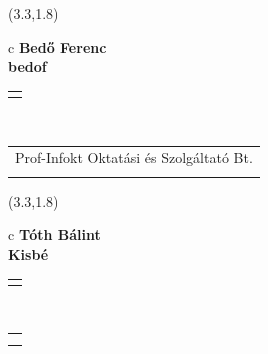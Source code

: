 \documentclass[11pt]{article}
\begin{document}
\makebox(3.3,1.8){
  \renewcommand\arraystretch{1.3}
  \begin{tabular}[c]{c}
    \hspace{8.5mm}
    \LARGE\bf{ Bedő Ferenc }\\
    \hspace{8.5mm}
    \Large{ bedof }\\
    \renewcommand\arraystretch{3}
    \begin{tabular}[c]{c}
      \centering
      \fontfamily{phv}\selectfont{
        \textbf{
          \textsc{
            \scriptsize{
            \color{Dark}{ Ismerkedő }\color{Dark}{ Webmester }\color{Bright}{ Sminkmester }\color{Bright}{ Programozó }
            }
          }
        }
      }
    \end{tabular}
    \\
    \renewcommand\arraystretch{1}
    \begin{tabular}{p{3.3in}}
      \hspace{.7cm}Prof-Infokt Oktatási és Szolgáltató Bt.\\
      \hspace{.7cm}\emph{  }\\
    \end{tabular}
  \end{tabular}
}

\makebox(3.3,1.8){
  \renewcommand\arraystretch{1.3}
  \begin{tabular}[c]{c}
    \hspace{8.5mm}
    \LARGE\bf{ Tóth Bálint }\\
    \hspace{8.5mm}
    \Large{ Kisbé }\\
    \renewcommand\arraystretch{3}
    \begin{tabular}[c]{c}
      \centering
      \fontfamily{phv}\selectfont{
        \textbf{
          \textsc{
            \scriptsize{
            \color{Dark}{ Ismerkedő }\color{Bright}{ Webmester }\color{Bright}{ Sminkmester }\color{Bright}{ Programozó }
            }
          }
        }
      }
    \end{tabular}
    \\
    \renewcommand\arraystretch{1}
    \begin{tabular}{p{3.3in}}
      \hspace{.7cm}\\
      \hspace{.7cm}\emph{  }\\
    \end{tabular}
  \end{tabular}
}
\end{document}
